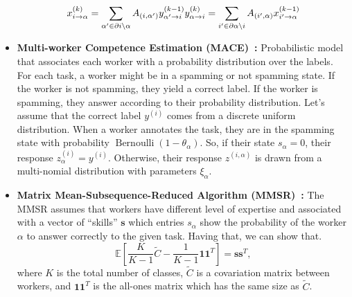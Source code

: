 \begin{itemize}
\begin{equation}
        x_{i \rightarrow \alpha}^{(k)} = \sum_{\alpha' \in \partial i \backslash \alpha} A_{(i, \alpha')} y_{\alpha' \rightarrow i}^{(k-1)} \\
        y_{\alpha \rightarrow i}^{(k)} = \sum_{i' \in \partial \alpha \backslash i} A_{(i',\alpha)} x_{i' \rightarrow \alpha}^{(k-1)}
    \end{equation}
    \item \textbf{Multi-worker Competence Estimation (MACE)~\cite{hovy_MACE_2013,crowdkit_webpage_documentation}:}
    Probabilistic model that associates each worker with a probability distribution over the labels. For each task, a worker might be in a spamming or not spamming state. If the worker is not spamming, they yield a correct label. If the worker is spamming, they answer according to their probability distribution. Let's assume that the correct label $y^{(i)}$ comes from a discrete uniform distribution. When a worker annotates the task, they are in the spamming state with probability $\operatorname{Bernoulli}(1 - \theta_{\alpha})$. So, if their state $s_{\alpha} = 0$, their response $z^{(i)}_{\alpha} = y^{(i)}$. Otherwise, their response $z^{(i,\alpha)}$ is drawn from a multi-nomial distribution with parameters $\xi_{\alpha}$.
    \item \textbf{Matrix Mean-Subsequence-Reduced Algorithm (MMSR)~\cite{ma_Adversarial_2020,crowdkit_webpage_documentation}:} The MMSR assumes that workers have different level of expertise and associated with a vector of ``skills'' $\boldsymbol{s}$ which entries $s_{\alpha}$ show the probability of the worker $\alpha$ to answer correctly to the given task. Having that, we can show that.
    \begin{equation}
        \mathbb{E}\left[\frac{K}{K-1}\widetilde{C}-\frac{1}{K-1}\boldsymbol{1}\boldsymbol{1}^T\right]
        = \boldsymbol{s}\boldsymbol{s}^T,
    \end{equation}
    where $K$ is the total number of classes, $\widetilde{C}$ is a covariation matrix between workers, and $\boldsymbol{1}\boldsymbol{1}^T$ is the all-ones matrix which has the same size as $\widetilde{C}$.


\end{itemize}
